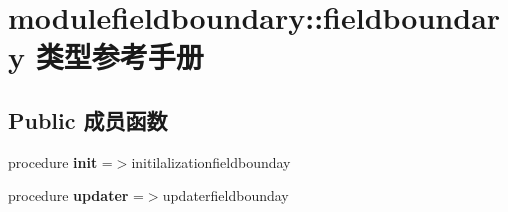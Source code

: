 \hypertarget{structmodulefieldboundary_1_1fieldboundary}{}\section{modulefieldboundary\+::fieldboundary 类型参考手册}
\label{structmodulefieldboundary_1_1fieldboundary}
\subsection*{Public 成员函数}
\begin{DoxyCompactItemize}
\item 
\mbox{\label{structmodulefieldboundary_1_1fieldboundary_a3516ad8ca653816b36a2b37fddc59042}} 
procedure {\bfseries init} =$>$initilalizationfieldbounday
\item 
\mbox{\label{structmodulefieldboundary_1_1fieldboundary_a8d143c788d53e1bbd4f33557838d1ac6}} 
procedure {\bfseries updater} =$>$updaterfieldbounday
\end{DoxyCompactItemize}
